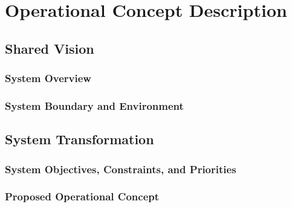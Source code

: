 \section{Operational Concept Description}


\subsection{Shared Vision}

	\subsubsection{System Overview}\begin{multicols}{2}
		
	\end{multicols}
 	\newpage

 	\subsubsection{System Boundary and Environment}
 	\newpage
 		
\subsection{System Transformation}
	\subsubsection{System Objectives, Constraints, and Priorities}\begin{multicols}{2}
		
	\end{multicols}
	
	\subsubsection{Proposed Operational Concept}
	
